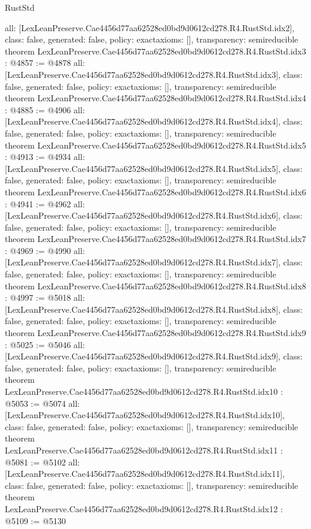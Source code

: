 \begin{lexlean}{RustStd}
\begin{coremodule}
{  all: [LexLeanPreserve.Cae4456d77aa62528ed0bd9d0612cd278.R4.RustStd.idx2],
  class: false,
  generated: false,
  policy: exact{axioms: []},
  transparency: semireducible
}
theorem LexLeanPreserve.Cae4456d77aa62528ed0bd9d0612cd278.R4.RustStd.idx3 : @4857 := @4878 {
  all: [LexLeanPreserve.Cae4456d77aa62528ed0bd9d0612cd278.R4.RustStd.idx3],
  class: false,
  generated: false,
  policy: exact{axioms: []},
  transparency: semireducible
}
theorem LexLeanPreserve.Cae4456d77aa62528ed0bd9d0612cd278.R4.RustStd.idx4 : @4885 := @4906 {
  all: [LexLeanPreserve.Cae4456d77aa62528ed0bd9d0612cd278.R4.RustStd.idx4],
  class: false,
  generated: false,
  policy: exact{axioms: []},
  transparency: semireducible
}
theorem LexLeanPreserve.Cae4456d77aa62528ed0bd9d0612cd278.R4.RustStd.idx5 : @4913 := @4934 {
  all: [LexLeanPreserve.Cae4456d77aa62528ed0bd9d0612cd278.R4.RustStd.idx5],
  class: false,
  generated: false,
  policy: exact{axioms: []},
  transparency: semireducible
}
theorem LexLeanPreserve.Cae4456d77aa62528ed0bd9d0612cd278.R4.RustStd.idx6 : @4941 := @4962 {
  all: [LexLeanPreserve.Cae4456d77aa62528ed0bd9d0612cd278.R4.RustStd.idx6],
  class: false,
  generated: false,
  policy: exact{axioms: []},
  transparency: semireducible
}
theorem LexLeanPreserve.Cae4456d77aa62528ed0bd9d0612cd278.R4.RustStd.idx7 : @4969 := @4990 {
  all: [LexLeanPreserve.Cae4456d77aa62528ed0bd9d0612cd278.R4.RustStd.idx7],
  class: false,
  generated: false,
  policy: exact{axioms: []},
  transparency: semireducible
}
theorem LexLeanPreserve.Cae4456d77aa62528ed0bd9d0612cd278.R4.RustStd.idx8 : @4997 := @5018 {
  all: [LexLeanPreserve.Cae4456d77aa62528ed0bd9d0612cd278.R4.RustStd.idx8],
  class: false,
  generated: false,
  policy: exact{axioms: []},
  transparency: semireducible
}
theorem LexLeanPreserve.Cae4456d77aa62528ed0bd9d0612cd278.R4.RustStd.idx9 : @5025 := @5046 {
  all: [LexLeanPreserve.Cae4456d77aa62528ed0bd9d0612cd278.R4.RustStd.idx9],
  class: false,
  generated: false,
  policy: exact{axioms: []},
  transparency: semireducible
}
theorem LexLeanPreserve.Cae4456d77aa62528ed0bd9d0612cd278.R4.RustStd.idx10 : @5053 := @5074 {
  all: [LexLeanPreserve.Cae4456d77aa62528ed0bd9d0612cd278.R4.RustStd.idx10],
  class: false,
  generated: false,
  policy: exact{axioms: []},
  transparency: semireducible
}
theorem LexLeanPreserve.Cae4456d77aa62528ed0bd9d0612cd278.R4.RustStd.idx11 : @5081 := @5102 {
  all: [LexLeanPreserve.Cae4456d77aa62528ed0bd9d0612cd278.R4.RustStd.idx11],
  class: false,
  generated: false,
  policy: exact{axioms: []},
  transparency: semireducible
}
theorem LexLeanPreserve.Cae4456d77aa62528ed0bd9d0612cd278.R4.RustStd.idx12 : @5109 := @5130 {
}
\end{coremodule}
\end{lexlean}
